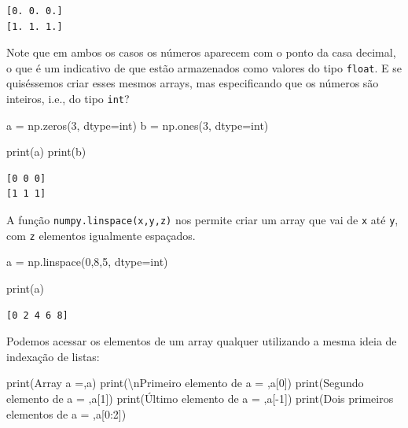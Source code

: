 \documentclass[
  brazilian,
  letterpaper,
  DIV=11,
  numbers=noendperiod]{scrreprt}
\newenvironment{Shaded}{\begin{snugshade}}{\end{snugshade}}
\newcommand{\BuiltInTok}[1]{\textcolor[rgb]{0.00,0.23,0.31}{#1}}
\newcommand{\CharTok}[1]{\textcolor[rgb]{0.13,0.47,0.30}{#1}}
\newcommand{\DecValTok}[1]{\textcolor[rgb]{0.68,0.00,0.00}{#1}}
\newcommand{\NormalTok}[1]{\textcolor[rgb]{0.00,0.23,0.31}{#1}}
\newcommand{\OperatorTok}[1]{\textcolor[rgb]{0.37,0.37,0.37}{#1}}
\newcommand{\StringTok}[1]{\textcolor[rgb]{0.13,0.47,0.30}{#1}}
\begin{document}
\begin{verbatim}
[0. 0. 0.]
[1. 1. 1.]
\end{verbatim}

Note que em ambos os casos os números aparecem com o ponto da casa
decimal, o que é um indicativo de que estão armazenados como valores do
tipo \texttt{float}. E se quiséssemos criar esses mesmos arrays, mas
especificando que os números são inteiros, i.e., do tipo \texttt{int}?

\begin{Shaded}
\begin{Highlighting}[]
\NormalTok{a }\OperatorTok{=}\NormalTok{ np.zeros(}\DecValTok{3}\NormalTok{, dtype}\OperatorTok{=}\BuiltInTok{int}\NormalTok{)}
\NormalTok{b }\OperatorTok{=}\NormalTok{ np.ones(}\DecValTok{3}\NormalTok{, dtype}\OperatorTok{=}\BuiltInTok{int}\NormalTok{)}

\BuiltInTok{print}\NormalTok{(a)}
\BuiltInTok{print}\NormalTok{(b)}
\end{Highlighting}
\end{Shaded}

\begin{verbatim}
[0 0 0]
[1 1 1]
\end{verbatim}

A função \texttt{numpy.linspace(x,y,z)} nos permite criar um array que
vai de \texttt{x} até \texttt{y}, com \texttt{z} elementos igualmente
espaçados.

\begin{Shaded}
\begin{Highlighting}[]
\NormalTok{a }\OperatorTok{=}\NormalTok{ np.linspace(}\DecValTok{0}\NormalTok{,}\DecValTok{8}\NormalTok{,}\DecValTok{5}\NormalTok{, dtype}\OperatorTok{=}\BuiltInTok{int}\NormalTok{)}

\BuiltInTok{print}\NormalTok{(a)}
\end{Highlighting}
\end{Shaded}

\begin{verbatim}
[0 2 4 6 8]
\end{verbatim}

Podemos acessar os elementos de um array qualquer utilizando a mesma
ideia de indexação de listas:

\begin{Shaded}
\begin{Highlighting}[]
\BuiltInTok{print}\NormalTok{(}\StringTok{\textquotesingle{}Array a =\textquotesingle{}}\NormalTok{,a)}
\BuiltInTok{print}\NormalTok{(}\StringTok{\textquotesingle{}}\CharTok{\textbackslash{}n}\StringTok{Primeiro elemento de a = \textquotesingle{}}\NormalTok{,a[}\DecValTok{0}\NormalTok{])}
\BuiltInTok{print}\NormalTok{(}\StringTok{\textquotesingle{}Segundo elemento de a = \textquotesingle{}}\NormalTok{,a[}\DecValTok{1}\NormalTok{])}
\BuiltInTok{print}\NormalTok{(}\StringTok{\textquotesingle{}Último elemento de a = \textquotesingle{}}\NormalTok{,a[}\OperatorTok{{-}}\DecValTok{1}\NormalTok{])}
\BuiltInTok{print}\NormalTok{(}\StringTok{\textquotesingle{}Dois primeiros elementos de a = \textquotesingle{}}\NormalTok{,a[}\DecValTok{0}\NormalTok{:}\DecValTok{2}\NormalTok{])}
\end{Highlighting}
\end{Shaded}
\end{document}

